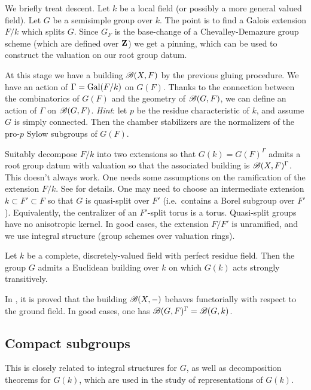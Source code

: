 We briefly treat descent. Let $k$ be a local field (or possibly a more general 
valued field). Let $G$ be a semisimple group over $k$. The point is to find a 
Galois extension $F/k$ which splits $G$. Since $G_F$ is the base-change 
of a Chevalley-Demazure group scheme (which are defined over $\mathbf{Z}$) we 
get a pinning, which can be used to construct the valuation on our root group 
datum. 

At this stage we have a building $\mathscr{B}(X,F)$ by the previous gluing procedure. 
We have an action of $\Gamma=\operatorname{Gal}(F/k)$ on $G(F)$. Thanks to the connection 
between the combinatorics of $G(F)$ and the geometry of $\mathscr{B}(G,F)$, we can 
define an action of $\Gamma$ on $\mathscr{B}(G,F)$. \emph{Hint}: let $p$ be the 
residue characteristic of $k$, and assume $G$ is simply connected. Then the 
chamber stabilizers are the normalizers of the pro-$p$ Sylow subgroups of 
$G(F)$. 

Suitably decompose $F/k$ into two extensions so that $G(k)=G(F)^\Gamma$ admits 
a root group datum with valuation so that the associated building is 
$\mathscr{B}(X,F)^\Gamma$. This doesn't always work. One needs some assumptions on the 
ramification of the extension $F/k$. See \cite{bt84} for details. One may 
need to choose an intermediate extension $k\subset F'\subset F$ so that 
$G$ is quasi-split over $F'$ (i.e.~contains a Borel subgroup over $F'$). 
Equivalently, the centralizer of an $F'$-split torus is a torus. Quasi-split 
groups have no anisotropic kernel. In good cases, the extension $F/F'$ is 
unramified, and we use integral structure (group schemes over valuation 
rings). 

\begin{theo}
Let $k$ be a complete, discretely-valued field with perfect residue field. Then 
the group $G$ admits a Euclidean building over $k$ on which $G(k)$ acts 
strongly transitively. 
\end{theo}

In \cite{r77}, it is proved that the building $\mathscr{B}(X,-)$ behaves functorially 
with respect to the ground field. In good cases, one has 
$\mathscr{B}(G,F)^\Gamma = \mathscr{B}(G,k)$. 




\subsection{Compact subgroups}

This is closely related to integral structures for $G$, as well as decomposition 
theorems for $G(k)$, which are used in the study of representations of $G(k)$. 

